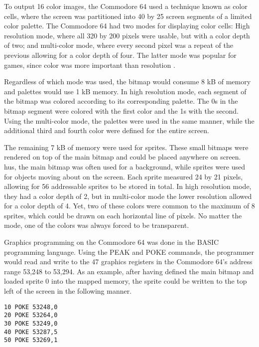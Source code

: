 To output 16 color images, the Commodore 64 used a technique known as color cells, where the screen was partitioned into 40 by 25 screen segments of a limited color palette. 
The Commodore 64 had two modes for displaying color cells: High resolution mode, where all 320 by 200 pixels were usable, but with a color depth of two; and multi-color mode, where every second pixel was a repeat of the previous allowing for a color depth of four.
The latter mode was popular for games, since color was more important than resolution \cite{bogdan2014games}.


Regardless of which mode was used, the bitmap would consume 8 kB of memory and palettes would use 1 kB memory.
In high resolution mode, each segment of the bitmap was colored according to its corresponding palette.
The 0s in the bitmap segment were colored with the first color and the 1s with the second.
Using the multi-color mode, the palettes were used in the same manner, while the additional third and fourth color were defined for the entire screen.


The remaining 7 kB of memory were used for sprites.
These small bitmaps were rendered on top of the main bitmap and could be placed anywhere on screen.
hus, the main bitmap was often used for a background, while sprites were used for objects moving about on the screen.
Each sprite measured 24 by 21 pixels, allowing for 56 addressable sprites to be stored in total.
In high resolution mode, they had a color depth of 2, but in multi-color mode the lower resolution allowed for a color depth of 4.
Yet, two of these colors were common to the maximum of 8 sprites, which could be drawn on each horizontal line of pixels.
No matter the mode, one of the colors was always forced to be transparent.  

Graphics programming on the Commodore 64 was done in the BASIC programming language.
Using the PEAK and POKE commands, the programmer would read and write to the 47 graphics registers in the Commodore 64’s address range 53,248 to 53,294. 
As an example, after having defined the main bitmap and loaded sprite 0 into the mapped memory, the sprite could be written to the top left of the screen in the following manner. 


\begin{lstlisting}[caption={Small BASIC program that places sprite 0 in the top left part of the screen. }]
10 POKE 53248,0
20 POKE 53264,0
30 POKE 53249,0
40 POKE 53287,5
50 POKE 53269,1
\end{lstlisting}



